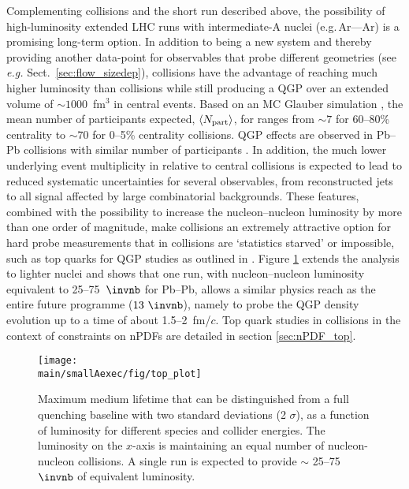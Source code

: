 Complementing \PbPb collisions and the short \OO run described above, 
the possibility of high-luminosity extended LHC runs with intermediate-A nuclei (e.g.\,Ar—Ar)
is a promising long-term option.
In addition to being a new system and thereby providing another data-point for observables that probe different geometries (see \textit{e.g.} Sect.~\ref{sec:flow_sizedep}), \ArAr collisions have the advantage of reaching much higher luminosity than \PbPb collisions while still producing a QGP over an extended volume of $\sim 1000$~fm$^3$ in central events. Based on an MC Glauber simulation \cite{Loizides:2017ack}, the mean number of participants expected, $\langle N_{\rm part}\rangle$, for \ArAr ranges from  $\sim 7$ for 60--80\% centrality to $\sim 70$ for 0--5\% centrality collisions.  
QGP effects are observed in Pb--Pb collisions with similar number of participants \cite{Sirunyan:2018eqi, ATLAS-CONF-2018-007}.  In addition, the much lower underlying event multiplicity in \ArAr relative to central \PbPb collisions is expected to lead to reduced  systematic uncertainties for several observables, from reconstructed jets to all signal affected by large combinatorial backgrounds.  These features, combined with the possibility to increase the nucleon--nucleon luminosity by more than one order of magnitude, make \ArAr collisions an extremely attractive option for hard probe measurements that in \PbPb collisions are `statistics starved' or impossible, such as top quarks for QGP studies as outlined in \cite{Apolinario:2017sob}.  Figure \ref{fig:boosted_tops} extends the analysis to lighter nuclei and shows that one \ArAr run, with nucleon--nucleon luminosity equivalent to 25--75~$\invnb$ for Pb--Pb, allows a similar physics reach as the entire \PbPb future programme ($13~\invnb$), namely to probe the QGP density evolution up to a time of about 1.5--2~fm/$c$.  Top quark studies in \ArAr collisions in the context of constraints on nPDFs are detailed in section \ref{sec:nPDF_top}.
\begin{figure}
\centering
\texttt{[image: \\main/smallAexec/fig/top\_plot]}
\caption{Maximum medium lifetime that can be distinguished from a full quenching baseline with two standard deviations (2 $\sigma$), as a function of luminosity for different species and collider energies. The luminosity on the $x$-axis is maintaining an equal number of nucleon-nucleon collisions. A single \ArAr run is expected to provide $\sim$ 25--75 $\invnb$ of \PbPb equivalent luminosity.}
\label{fig:boosted_tops}
\end{figure}

